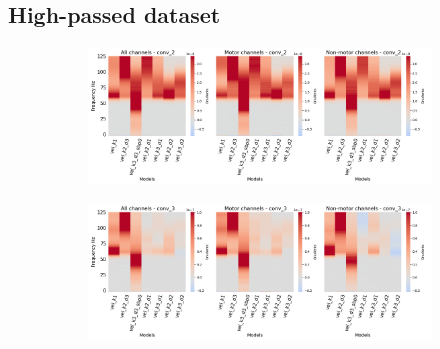 \subsection*{High-passed dataset}\label{subsec:vel-high-passed-dataset-appendixD}
\begin{figure}[!htpb]
\centering
\begin{subfigure}[b]{\textwidth}
   \includegraphics[width=1\linewidth]{img/appendix/D/conv-2/hp-sm/vel_model_gradients_all_kinds}
   \caption{}
   \label{fig:vel-pw-hp-grads-conv-2}
\end{subfigure}

\begin{subfigure}[b]{\textwidth}
   \includegraphics[width=1\linewidth]{img/appendix/D/conv-3/hp-m/vel_model_gradients_all_kinds}
   \caption{}
   \label{fig:vel-pw-hp-grads-conv-3}
\end{subfigure}
\end{figure}
\clearpage   

